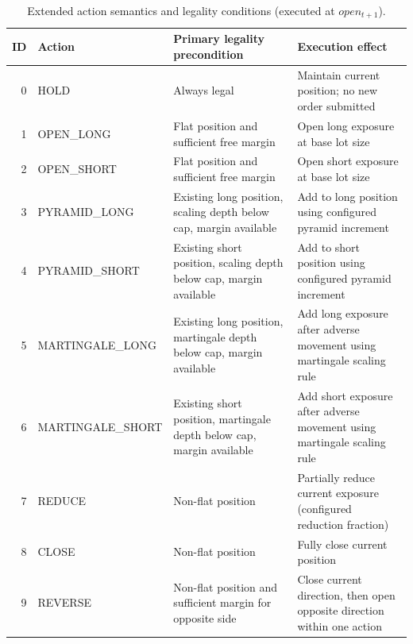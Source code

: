 \begin{table}[!tbp]
\centering
\caption{Extended action semantics and legality conditions (executed at $open_{t+1}$).}
\label{tab:action_definitions}

\begin{tabularx}{\linewidth}{@{}r l >{\raggedright\arraybackslash}X >{\raggedright\arraybackslash}X@{}}
\toprule
\textbf{ID} & \textbf{Action} & \textbf{Primary legality precondition} & \textbf{Execution effect} \\
\midrule
0 & HOLD & Always legal & Maintain current position; no new order submitted \\
1 & OPEN\_LONG & Flat position and sufficient free margin & Open long exposure at base lot size \\
2 & OPEN\_SHORT & Flat position and sufficient free margin & Open short exposure at base lot size \\
3 & PYRAMID\_LONG & Existing long position, scaling depth below cap, margin available & Add to long position using configured pyramid increment \\
4 & PYRAMID\_SHORT & Existing short position, scaling depth below cap, margin available & Add to short position using configured pyramid increment \\
5 & MARTINGALE\_LONG & Existing long position, martingale depth below cap, margin available & Add long exposure after adverse movement using martingale scaling rule \\
6 & MARTINGALE\_SHORT & Existing short position, martingale depth below cap, margin available & Add short exposure after adverse movement using martingale scaling rule \\
7 & REDUCE & Non-flat position & Partially reduce current exposure (configured reduction fraction) \\
8 & CLOSE & Non-flat position & Fully close current position \\
9 & REVERSE & Non-flat position and sufficient margin for opposite side & Close current direction, then open opposite direction within one action \\
\bottomrule
\end{tabularx}
\end{table}



